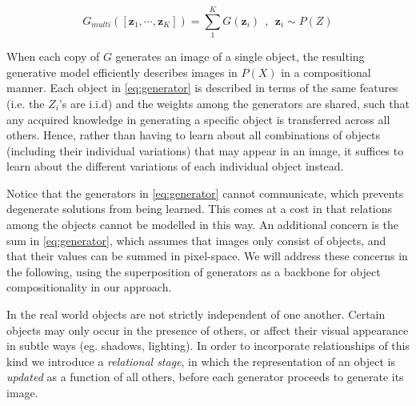 \documentclass{article}
\begin{document}
\begin{equation}
G_{multi}([\bm{z}_1, \cdots, \bm{z}_K]) = \sum_1^K G(\bm{z}_i) \ \ , \ \ \bm{z}_i \sim P(Z)
\label{eq:generator}
\end{equation}

When each copy of $G$ generates an image of a single object, the resulting generative model efficiently describes images in $P(X)$ in a compositional manner.
Each object in \eqref{eq:generator} is described in terms of the same features (i.e. the $Z_i$'s are i.i.d) and the weights among the generators are shared, such that any acquired knowledge in generating a specific object is transferred across all others.
Hence, rather than having to learn about all combinations of objects (including their individual variations) that may appear in an image, it suffices to learn about the different variations of each individual object instead.

Notice that the generators in \eqref{eq:generator} cannot communicate, which prevents degenerate solutions from being learned.
This comes at a cost in that relations among the objects cannot be modelled in this way.
An additional concern is the sum in \eqref{eq:generator}, which assumes that images only consist of objects, and that their values can be summed in pixel-space.
We will address these concerns in the following, using the superposition of generators as a backbone for object compositionality in our approach.


In the real world objects are not strictly independent of one another.
Certain objects may only occur in the presence of others, or affect their visual appearance in subtle ways (eg. shadows, lighting).
In order to incorporate relationships of this kind we introduce a \emph{relational stage}, in which the representation of an object is \emph{updated} as a function of all others, before each generator proceeds to generate its image. %
\end{document}
